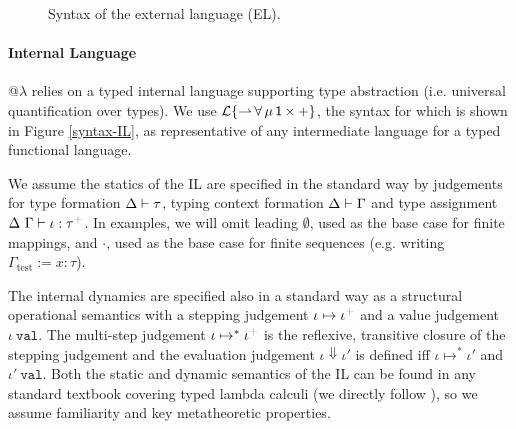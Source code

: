 \documentclass[10pt,preprint]{sigplanconf}
\newcommand{\moutput}{^{\color{gray}+}}
\begin{document}
\begin{figure}[t]
\small
\hspace{-5px}
\caption{Syntax of the external language (EL).}\label{syntax-EL}
\end{figure}



\paragraph{Internal Language} 
@$\lambda$ relies on a typed internal language supporting type abstraction (i.e. universal quantification over types). We use {$\mathcal{L}\{{\rightharpoonup}\,{\forall}\,{\mu}\,{{\sf 1}}\,{\times}\,{+}\}$}, the syntax for which is shown in Figure \ref{syntax-IL}, as representative of any intermediate language for a typed functional language. %

We assume the statics of the IL are specified in the standard way by judgements for  type formation {$\Delta \vdash \tau$}, typing context formation { $\Delta \vdash \Gamma$} and type assignment {$\iDelta~\iGamma \vdash \iota : \tau\moutput$}. 
In examples, we will omit leading $\emptyset$, used as the base case for finite mappings, and $\cdot$, used as the base case for finite sequences (e.g. writing $\Gamma_\text{test} := x : \tau$). 

The internal dynamics are specified also in a standard way as a structural operational semantics with a stepping judgement {\small $\iota \mapsto \iota\moutput$} and a value judgement {$\iota~\mathtt{val}$}. The multi-step judgement $\iota \mapsto^{*} \iota\moutput$ is the reflexive, transitive closure of the stepping judgement and the evaluation judgement $\iota \Downarrow \iota'$ is defined iff $\iota \mapsto^{*} \iota'$ and $\iota'~\mathtt{val}$. Both the static and dynamic semantics of the IL can be found in any standard textbook covering typed lambda calculi (we directly follow \cite{pfpl}), so we assume familiarity and key metatheoretic properties.

\end{document}
